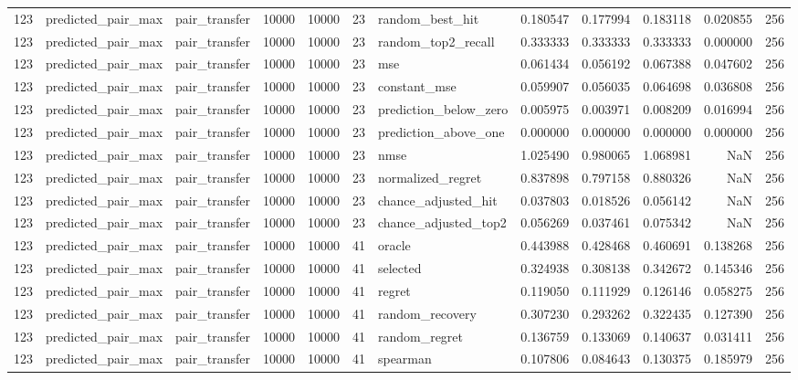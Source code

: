 \begin{tabular}{rllrrrlrrrrr}
123 & predicted_pair_max & pair_transfer & 10000 & 10000 & 23 & random_best_hit & 0.180547 & 0.177994 & 0.183118 & 0.020855 & 256 \\
123 & predicted_pair_max & pair_transfer & 10000 & 10000 & 23 & random_top2_recall & 0.333333 & 0.333333 & 0.333333 & 0.000000 & 256 \\
123 & predicted_pair_max & pair_transfer & 10000 & 10000 & 23 & mse & 0.061434 & 0.056192 & 0.067388 & 0.047602 & 256 \\
123 & predicted_pair_max & pair_transfer & 10000 & 10000 & 23 & constant_mse & 0.059907 & 0.056035 & 0.064698 & 0.036808 & 256 \\
123 & predicted_pair_max & pair_transfer & 10000 & 10000 & 23 & prediction_below_zero & 0.005975 & 0.003971 & 0.008209 & 0.016994 & 256 \\
123 & predicted_pair_max & pair_transfer & 10000 & 10000 & 23 & prediction_above_one & 0.000000 & 0.000000 & 0.000000 & 0.000000 & 256 \\
123 & predicted_pair_max & pair_transfer & 10000 & 10000 & 23 & nmse & 1.025490 & 0.980065 & 1.068981 & NaN & 256 \\
123 & predicted_pair_max & pair_transfer & 10000 & 10000 & 23 & normalized_regret & 0.837898 & 0.797158 & 0.880326 & NaN & 256 \\
123 & predicted_pair_max & pair_transfer & 10000 & 10000 & 23 & chance_adjusted_hit & 0.037803 & 0.018526 & 0.056142 & NaN & 256 \\
123 & predicted_pair_max & pair_transfer & 10000 & 10000 & 23 & chance_adjusted_top2 & 0.056269 & 0.037461 & 0.075342 & NaN & 256 \\
123 & predicted_pair_max & pair_transfer & 10000 & 10000 & 41 & oracle & 0.443988 & 0.428468 & 0.460691 & 0.138268 & 256 \\
123 & predicted_pair_max & pair_transfer & 10000 & 10000 & 41 & selected & 0.324938 & 0.308138 & 0.342672 & 0.145346 & 256 \\
123 & predicted_pair_max & pair_transfer & 10000 & 10000 & 41 & regret & 0.119050 & 0.111929 & 0.126146 & 0.058275 & 256 \\
123 & predicted_pair_max & pair_transfer & 10000 & 10000 & 41 & random_recovery & 0.307230 & 0.293262 & 0.322435 & 0.127390 & 256 \\
123 & predicted_pair_max & pair_transfer & 10000 & 10000 & 41 & random_regret & 0.136759 & 0.133069 & 0.140637 & 0.031411 & 256 \\
123 & predicted_pair_max & pair_transfer & 10000 & 10000 & 41 & spearman & 0.107806 & 0.084643 & 0.130375 & 0.185979 & 256 \\

\end{tabular}
